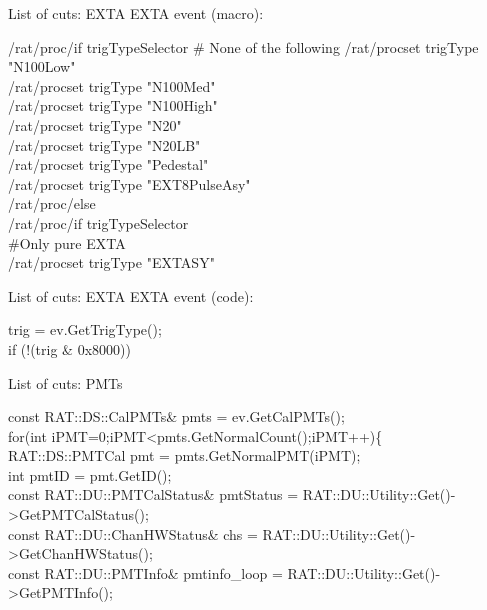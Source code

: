 \documentclass[xcolor=table]{beamer}
\begin{document}
\begin{frame}{List of cuts: EXTA}
EXTA event (macro):
\begin{tcolorbox}
/rat/proc/if trigTypeSelector
  \# None of the following
  \hspace*{5mm} /rat/procset trigType "N100Low" \\
  \hspace*{5mm} /rat/procset trigType "N100Med" \\
  \hspace*{5mm} /rat/procset trigType "N100High" \\
  \hspace*{5mm} /rat/procset trigType "N20" \\
  \hspace*{5mm} /rat/procset trigType "N20LB" \\
  \hspace*{5mm} /rat/procset trigType "Pedestal" \\
  \hspace*{5mm} /rat/procset trigType "EXT8PulseAsy" \\
/rat/proc/else \\
  \hspace*{5mm} /rat/proc/if trigTypeSelector \\
  \hspace*{5mm}\hspace*{5mm}  \#Only pure EXTA \\
  \hspace*{5mm}\hspace*{5mm} /rat/procset trigType "EXTASY"
\end{tcolorbox}
\end{frame}

\begin{frame}{List of cuts: EXTA}
EXTA event (code):
\begin{tcolorbox}
trig = ev.GetTrigType(); \\ 
if (!(trig \& 0x8000))
\end{tcolorbox}
\end{frame}

\begin{frame}{List of cuts: PMTs}
\begin{tcolorbox}
const RAT::DS::CalPMTs\& pmts = ev.GetCalPMTs(); \\
for(int iPMT=0;iPMT<pmts.GetNormalCount();iPMT++)\{\\
RAT::DS::PMTCal pmt = pmts.GetNormalPMT(iPMT); \\
int pmtID = pmt.GetID(); \\
const RAT::DU::PMTCalStatus\& pmtStatus = RAT::DU::Utility::Get()->GetPMTCalStatus(); \\
const RAT::DU::ChanHWStatus\& chs = RAT::DU::Utility::Get()->GetChanHWStatus(); \\
const RAT::DU::PMTInfo\& pmtinfo\_loop = RAT::DU::Utility::Get()->GetPMTInfo();
\end{tcolorbox}
\end{frame}
\end{document}
